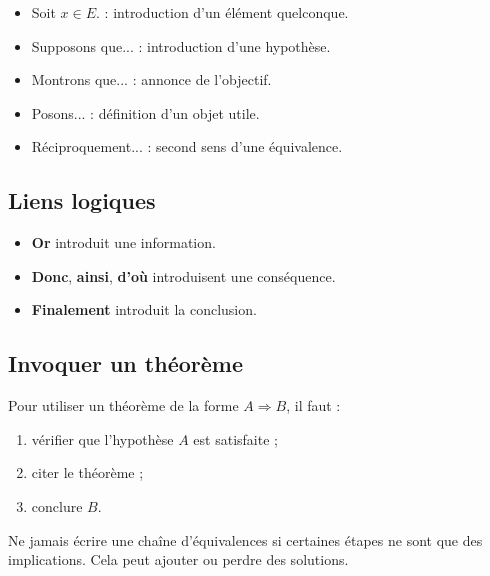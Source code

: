 \documentclass[11pt,a4paper]{article}
\newcommand{\imp}{\Rightarrow}
\begin{document}
\begin{methodebox}
\begin{itemize}
    \item \og Soit \(x\in E\). \fg{} : introduction d'un élément quelconque.
    \item \og Supposons que... \fg{} : introduction d'une hypothèse.
    \item \og Montrons que... \fg{} : annonce de l'objectif.
    \item \og Posons... \fg{} : définition d'un objet utile.
    \item \og Réciproquement... \fg{} : second sens d'une équivalence.
\end{itemize}
\end{methodebox}

\subsection{Liens logiques}

\begin{retenirbox}
\begin{itemize}
    \item \textbf{Or} introduit une information.
    \item \textbf{Donc}, \textbf{ainsi}, \textbf{d'où} introduisent une conséquence.
    \item \textbf{Finalement} introduit la conclusion.
\end{itemize}
\end{retenirbox}

\subsection{Invoquer un théorème}

\begin{methodebox}
Pour utiliser un théorème de la forme \(A\imp B\), il faut :
\begin{enumerate}
    \item vérifier que l'hypothèse \(A\) est satisfaite ;
    \item citer le théorème ;
    \item conclure \(B\).
\end{enumerate}
\end{methodebox}

\begin{piegebox}
Ne jamais écrire une chaîne d'équivalences si certaines étapes ne sont que des implications. Cela peut ajouter ou perdre des solutions.
\end{piegebox}
\end{document}

